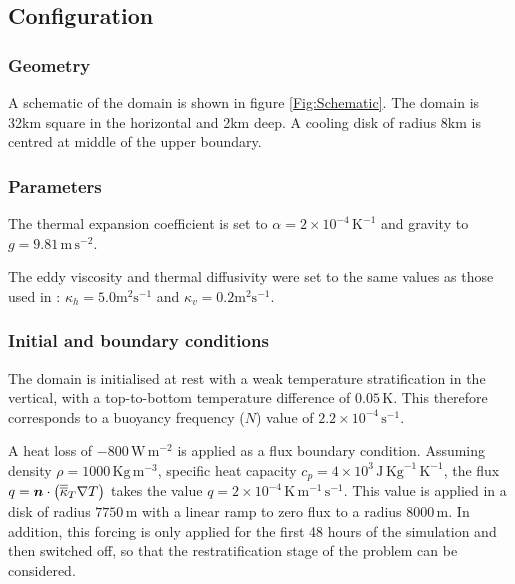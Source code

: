 \subsection{Configuration}

\subsubsection{Geometry}



A schematic of the domain is shown in figure \ref{Fig:Schematic}.
The domain is 32km square in the horizontal and 2km deep. A cooling disk of radius
8km is centred at middle of the upper boundary.




\subsubsection{Parameters}
The thermal expansion coefficient is set to
$\alpha=2 \times 10^{-4} \,\mathrm{K}^{-1}$ and gravity to $g=9.81 \,\mathrm{m}\,\mathrm{s}^{-2}$.

The eddy viscosity
and thermal diffusivity were set to the same values as those
used in \cite{jones1993}: $\kappa_h = 5.0 \mathrm{m}^2\mathrm{s}^{-1}$ and
$\kappa_v = 0.2 \mathrm{m}^2\mathrm{s}^{-1}$.


\subsubsection{Initial and boundary conditions}
The domain is initialised at rest with a weak temperature stratification
in the vertical, with a top-to-bottom temperature difference of
$0.05\,$K.
This therefore corresponds to a buoyancy frequency ($N$) value
of $2.2 \times 10^{-4} \,\mathrm{s}^{-1}$.


A heat loss of $-800\,\mathrm{W}\,\mathrm{m}^{-2}$ is
applied as a flux boundary condition. Assuming density $\rho=1000\,\mathrm{Kg}\,\mathrm{m}^{-3}$,
specific heat capacity $c_p=4\times 10^3\,\mathrm{J}\,\mathrm{Kg}^{-1}\,\mathrm{K}^{-1}$,
the flux $q={\mbox{\boldmath$n$}}\cdot\left ( \overline{\overline{\kappa}}_T  \nabla T\right)$
takes the value $q = 2\times 10^{-4}\,\mathrm{K}\,\mathrm{m}^{-1}\,\mathrm{s}^{-1}$.
This value is applied in a disk of radius $7750\,\mathrm{m}$ with a linear ramp to zero flux to a radius
$8000\,\mathrm{m}$. In addition, this forcing is only applied for the first 48 hours of the simulation and
then switched off, so that the restratification stage of the problem can be considered.



